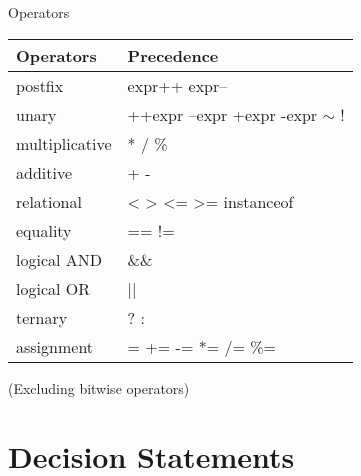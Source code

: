 \documentclass{beamer}
\begin{document}
\begin{frame}{Operators}
\begin{table}[]
\begin{tabular}{|l|l|}
\hline
\textbf{Operators}   & \textbf{Precedence}                                                                        \\ \hline
postfix              & expr++ expr--                                                                              \\ \hline
unary                & ++expr --expr +expr -expr $\sim$ \hspace{0.1cm} !                                                          \\ \hline
multiplicative       & * / \%                                                                                     \\ \hline
additive             & + -                                                                                        \\ \hline
relational           & \textless \hspace{0.1cm} \textgreater \hspace{0.1cm} \textless{}= \hspace{0.1cm} \textgreater{}= \hspace{0.1cm} instanceof                             \\ \hline
equality             & == !=  \\ \hline
logical AND          & \&\&                                                                                       \\ \hline
logical OR           & ||                                                                                         \\ \hline
ternary              & ? :                                                                                        \\ \hline
assignment           & = += -= *= /= \%=                                                                                    \\ \hline
\end{tabular}
\end{table}
 (Excluding bitwise operators)
\end{frame}

\section{Decision Statements}
\end{document}
